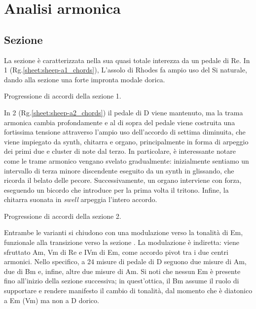 \documentclass[class=book, crop=false, oneside, 12pt]{standalone}
\begin{document}
    \section{Analisi armonica}
    \label{sec:04-harmony}

    \subsection{Sezione }
    La sezione  è caratterizzata nella sua quasi totale interezza da un pedale di Re. In 1 (Rg.\ref{sheet:sheep-a1_chords}), L'assolo di Rhodes fa ampio uso del Si naturale, dando alla sezione una forte impronta modale dorica.     
    
    \begin{sheet}[htb]
        \centering
        \caption{Progressione di accordi della sezione 1.}
        \label{sheet:sheep-a1_chords}
    \end{sheet}

    In 2 (Rg.\ref{sheet:sheep-a2_chords}) il pedale di D viene mantenuto, ma la trama armonica cambia profondamente e al di sopra del pedale viene costruita una fortissima tensione attraverso l'ampio uso dell'accordo di settima diminuita, che viene impiegato da synth, chitarra e organo, principalmente in forma di arpeggio dei primi due e cluster di note dal terzo. In particolare, è interessante notare come le trame armonico vengano svelato gradualmente: inizialmente sentiamo un intervallo di terza minore discendente eseguito da un synth in glissando, che ricorda il belato delle pecore.
    Successivamente, un organo interviene con forza, eseguendo un bicordo che introduce per la prima volta il tritono. Infine, la chitarra suonata in \emph{swell} arpeggia l'intero accordo. 
    
    \begin{sheet}[htb]
        \centering
        \caption{Progressione di accordi della sezione 2.}
        \label{sheet:sheep-a2_chords}
    \end{sheet}

    Entrambe le varianti si chiudono con una modulazione verso la tonalità di Em, funzionale alla transizione verso la sezione . La modulazione è indiretta: viene sfruttato Am, Vm di Re e IVm di Em,  come accordo pivot tra i due centri armonici. Nello specifico, a 24 misure di pedale di D seguono due misure di Am, due di Bm e, infine, altre due misure di Am. Si noti che nessun Em è presente fino all'inizio della sezione successiva; in quest'ottica,  il Bm assume il ruolo di supportare e rendere manifesto il cambio di tonalità, dal momento che è diatonico a Em (Vm) ma non a D dorico. 
\end{document}
